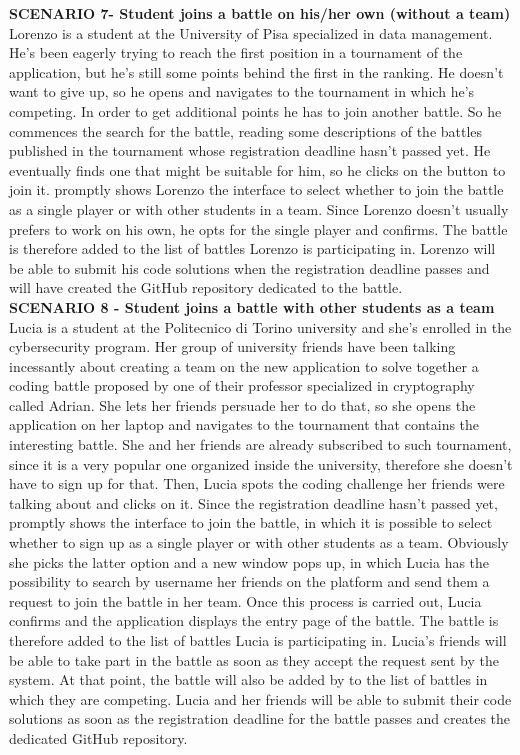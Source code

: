     \textbf{SCENARIO 7- Student joins a battle on his/her own (without a team)}\\
    Lorenzo is a student at the University of Pisa specialized in data management. He's been eagerly trying to reach the first position in a tournament of the \app application, but he's still some points behind the first in the ranking. He doesn't want to give up, so he opens \app and navigates to the tournament in which he's competing. In order to get additional points he has to join another battle. So he commences the search for the battle, reading some descriptions of the battles published in the tournament whose registration deadline hasn't passed yet. He eventually finds one that might be suitable for him, so he clicks on the button to join it. \app promptly shows Lorenzo the interface to select whether to join the battle as a single player or with other students in a team. Since Lorenzo doesn't usually prefers to work on his own, he opts for the single player and confirms.
    The battle is therefore added to the list of battles Lorenzo is participating in. Lorenzo will be able to submit his code solutions when the registration deadline passes and \app will have created the GitHub repository dedicated to the battle.\\

    \textbf{SCENARIO 8 - Student joins a battle with other students as a team}\\
    Lucia is a student at the Politecnico di Torino university and she's enrolled in the cybersecurity program. Her group of university friends have been talking incessantly about creating a team on the new \app application to solve together a coding battle proposed by one of their professor specialized in cryptography called Adrian. She lets her friends persuade her to do that, so she opens the \app application on her laptop and navigates to the tournament that contains the interesting battle. She and her friends are already subscribed to such tournament, since it is a very popular one organized inside the university, therefore she doesn't have to sign up for that. Then, Lucia spots the coding challenge her friends were talking about and clicks on it. Since the registration deadline hasn't passed yet, \app promptly shows the interface to join the battle, in which it is possible to select whether to sign up as a single player or with other students as a team. Obviously she picks the latter option and a new window pops up, in which Lucia has the possibility to search by username her friends on the platform and send them a request to join the battle in her team. Once this process is carried out, Lucia confirms and the \app application displays the entry page of the battle. The battle is therefore added to the list of battles Lucia is participating in.
    Lucia's friends will be able to take part in the battle as soon as they accept the request sent by the system. At that point, the battle will also be added by \app to the list of battles in which they are competing.
    Lucia and her friends will be able to submit their code solutions as soon as the registration deadline for the battle passes and \app creates the dedicated GitHub repository.\\
    
